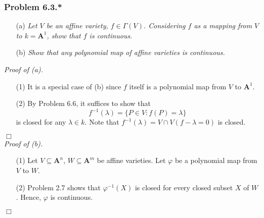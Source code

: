\documentclass{article}
\begin{document}



\subsubsection*{Problem 6.3.*}
\begin{enumerate}
\item[(a)]
  \emph{Let $V$ be an affine variety, $f \in \Gamma(V)$.
  Considering $f$ as a mapping from $V$ to $k = \mathbf{A}^{1}$,
  show that $f$ is continuous.}

\item[(b)]
  \emph{Show that any polynomial map of affine varieties is continuous.} \\
\end{enumerate}



\emph{Proof of (a).}
\begin{enumerate}
\item[(1)]
  It is a special case of (b) since $f$ itself is a polynomial map from
  $V$ to $\mathbf{A}^{1}$.

\item[(2)]
  By Problem 6.6, it suffices to show that
  \[
    f^{-1}(\lambda) = \{ P \in V : f(P) = \lambda \}
  \]
  is closed for any $\lambda \in k$.
  Note that $f^{-1}(\lambda) = V \cap V(f - \lambda = 0)$ is closed.
\end{enumerate}
$\Box$ \\



\emph{Proof of (b).}
\begin{enumerate}
\item[(1)]
  Let $V \subseteq \mathbf{A}^n$, $W \subseteq \mathbf{A}^m$ be affine varieties.
  Let $\varphi$ be a polynomial map from $V$ to $W$.

\item[(2)]
  Problem 2.7 shows that $\varphi^{-1}(X)$ is closed for every closed subset $X$ of $W$.
  Hence, $\varphi$ is continuous.
\end{enumerate}
$\Box$ \\\\



\end{document}
